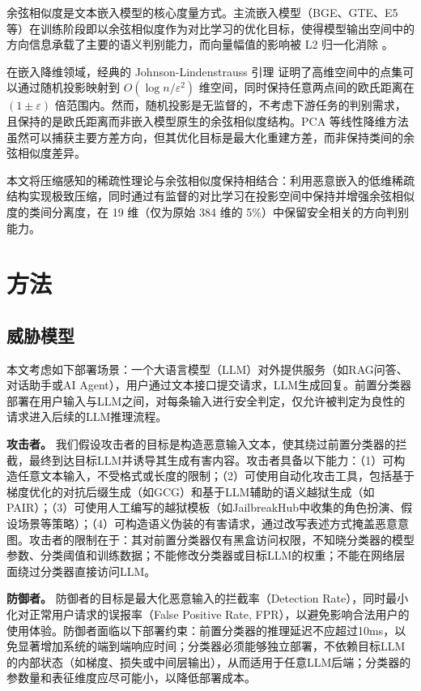 \documentclass[conference]{IEEEtran}
\begin{document}
余弦相似度是文本嵌入模型的核心度量方式。主流嵌入模型（BGE、GTE、E5 等）在训练阶段即以余弦相似度作为对比学习的优化目标，使得模型输出空间中的方向信息承载了主要的语义判别能力，而向量幅值的影响被 L2 归一化消除 \cite{b10}。

在嵌入降维领域，经典的 Johnson-Lindenstrauss 引理 \cite{b14} 证明了高维空间中的点集可以通过随机投影映射到 $O(\log n / \varepsilon^2)$ 维空间，同时保持任意两点间的欧氏距离在 $(1\pm\varepsilon)$ 倍范围内。然而，随机投影是无监督的，不考虑下游任务的判别需求，且保持的是欧氏距离而非嵌入模型原生的余弦相似度结构。PCA 等线性降维方法虽然可以捕获主要方差方向，但其优化目标是最大化重建方差，而非保持类间的余弦相似度差异。

本文将压缩感知的稀疏性理论与余弦相似度保持相结合：利用恶意嵌入的低维稀疏结构实现极致压缩，同时通过有监督的对比学习在投影空间中保持并增强余弦相似度的类间分离度，在 19 维（仅为原始 384 维的 5\%）中保留安全相关的方向判别能力。

\section{方法}

\subsection{威胁模型}

本文考虑如下部署场景：一个大语言模型（LLM）对外提供服务（如RAG问答、对话助手或AI Agent），用户通过文本接口提交请求，LLM生成回复。前置分类器部署在用户输入与LLM之间，对每条输入进行安全判定，仅允许被判定为良性的请求进入后续的LLM推理流程。

\textbf{攻击者。} 我们假设攻击者的目标是构造恶意输入文本，使其绕过前置分类器的拦截，最终到达目标LLM并诱导其生成有害内容。攻击者具备以下能力：（1）可构造任意文本输入，不受格式或长度的限制；（2）可使用自动化攻击工具，包括基于梯度优化的对抗后缀生成（如GCG）和基于LLM辅助的语义越狱生成（如PAIR）；（3）可使用人工编写的越狱模板（如JailbreakHub中收集的角色扮演、假设场景等策略）；（4）可构造语义伪装的有害请求，通过改写表述方式掩盖恶意意图。攻击者的限制在于：其对前置分类器仅有黑盒访问权限，不知晓分类器的模型参数、分类阈值和训练数据；不能修改分类器或目标LLM的权重；不能在网络层面绕过分类器直接访问LLM。

\textbf{防御者。} 防御者的目标是最大化恶意输入的拦截率（Detection Rate），同时最小化对正常用户请求的误报率（False Positive Rate, FPR），以避免影响合法用户的使用体验。防御者面临以下部署约束：前置分类器的推理延迟不应超过10ms，以免显著增加系统的端到端响应时间；分类器必须能够独立部署，不依赖目标LLM的内部状态（如梯度、损失或中间层输出），从而适用于任意LLM后端；分类器的参数量和表征维度应尽可能小，以降低部署成本。
\end{document}
